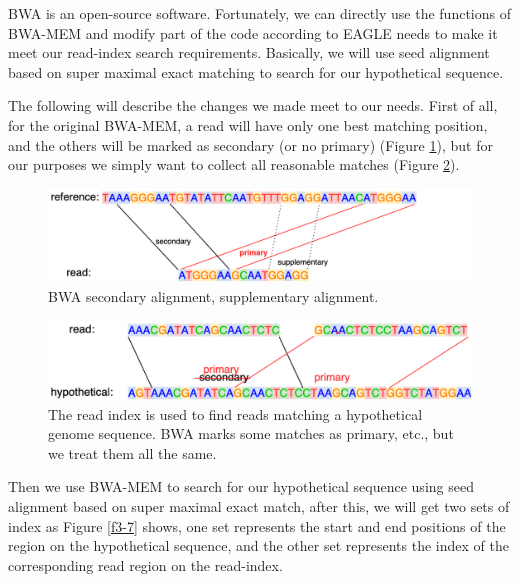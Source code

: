 BWA is an open-source software. Fortunately, we can directly use the functions of BWA-MEM and modify part of the code according to EAGLE needs to make it meet our read-index search requirements. Basically, we will use seed alignment based on super maximal exact matching to search for our hypothetical sequence.

The following will describe the changes we made meet to our needs. First of all, for the original BWA-MEM, a read will have only one best matching position, and the others will be marked as secondary (or no primary) (Figure \ref{f3-5}), but for our purposes we simply want to collect all reasonable matches (Figure \ref{f3-6}).

\vspace{1cm}
\begin{figure}[H]
    \centering
    \includegraphics[width=1\columnwidth]{body/image/3-5.png}
    \captionsetup{labelfont=bf}
    \renewcommand{\baselinestretch}{1.0}
    \vspace{-1cm}
    \caption[secondary alignment]{BWA secondary alignment, supplementary alignment.}
    \label{f3-5}
\end{figure}

\vspace{0.5cm}
\begin{figure}[H]
    \centering
    \includegraphics[width=1\columnwidth]{body/image/3-6.png}
    \captionsetup{labelfont=bf}
    \renewcommand{\baselinestretch}{1.0}
    \vspace{-1cm}
    \caption[primary alignment]{The read index is used to find reads matching a hypothetical genome sequence.  BWA marks some matches as primary, etc., but we treat them all the same.}
    \label{f3-6}
\end{figure}

Then we use BWA-MEM to search for our hypothetical sequence using seed alignment based on super maximal exact match, after this, we will get two sets of index as Figure \ref{f3-7} shows, one set represents the start and end positions of the region on the hypothetical sequence, and the other set represents the index of the corresponding read region on the read-index. 

